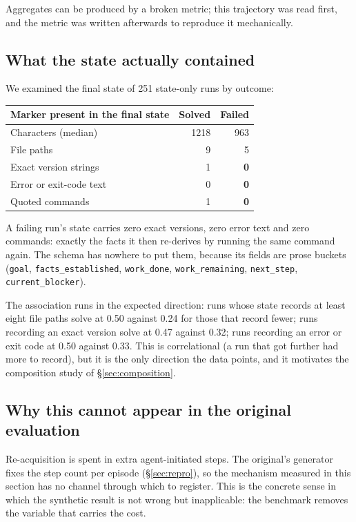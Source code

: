 Aggregates can be produced by a broken metric; this trajectory was read
first, and the metric was written afterwards to reproduce it mechanically.

\subsection{What the state actually contained}

We examined the final state of 251 state-only runs by outcome\live:

\begin{center}
\begin{tabular}{@{}lrr@{}}
\toprule
Marker present in the final state & Solved & Failed \\
\midrule
Characters (median)      & 1218 & 963 \\
File paths               & 9    & 5 \\
Exact version strings    & 1    & \textbf{0} \\
Error or exit-code text  & 0    & \textbf{0} \\
Quoted commands          & 1    & \textbf{0} \\
\bottomrule
\end{tabular}
\end{center}

A failing run's state carries zero exact versions, zero error text and zero
commands: exactly the facts it then re-derives by running the same command
again. The schema has nowhere to put them, because its fields are prose
buckets (\texttt{goal}, \texttt{facts\_established}, \texttt{work\_done},
\texttt{work\_remaining}, \texttt{next\_step}, \texttt{current\_blocker}).

The association runs in the expected direction\live: runs whose state
records at least eight file paths solve at 0.50 against 0.24 for those that
record fewer; runs recording an exact version solve at 0.47 against 0.32;
runs recording an error or exit code at 0.50 against 0.33. This is
correlational (a run that got further had more to record), but it is the
only direction the data points, and it motivates the composition study of
\S\ref{sec:composition}.

\subsection{Why this cannot appear in the original evaluation}

Re-acquisition is spent in extra agent-initiated steps. The original's
generator fixes the step count per episode (\S\ref{sec:repro}), so the
mechanism measured in this section has no channel through which to register.
This is the concrete sense in which the synthetic result is not wrong but
inapplicable: the benchmark removes the variable that carries the cost.
